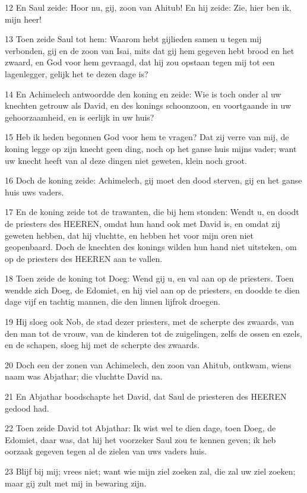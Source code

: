 \par 12 En Saul zeide: Hoor nu, gij, zoon van Ahitub! En hij zeide: Zie, hier ben ik, mijn heer!
\par 13 Toen zeide Saul tot hem: Waarom hebt gijlieden samen u tegen mij verbonden, gij en de zoon van Isai, mits dat gij hem gegeven hebt brood en het zwaard, en God voor hem gevraagd, dat hij zou opstaan tegen mij tot een lagenlegger, gelijk het te dezen dage is?
\par 14 En Achimelech antwoordde den koning en zeide: Wie is toch onder al uw knechten getrouw als David, en des konings schoonzoon, en voortgaande in uw gehoorzaamheid, en is eerlijk in uw huis?
\par 15 Heb ik heden begonnen God voor hem te vragen? Dat zij verre van mij, de koning legge op zijn knecht geen ding, noch op het ganse huis mijns vader; want uw knecht heeft van al deze dingen niet geweten, klein noch groot.
\par 16 Doch de koning zeide: Achimelech, gij moet den dood sterven, gij en het ganse huis uws vaders.
\par 17 En de koning zeide tot de trawanten, die bij hem stonden: Wendt u, en doodt de priesters des HEEREN, omdat hun hand ook met David is, en omdat zij geweten hebben, dat hij vluchtte, en hebben het voor mijn oren niet geopenbaard. Doch de knechten des konings wilden hun hand niet uitsteken, om op de priesters des HEEREN aan te vallen.
\par 18 Toen zeide de koning tot Doeg: Wend gij u, en val aan op de priesters. Toen wendde zich Doeg, de Edomiet, en hij viel aan op de priesters, en doodde te dien dage vijf en tachtig mannen, die den linnen lijfrok droegen.
\par 19 Hij sloeg ook Nob, de stad dezer priesters, met de scherpte des zwaards, van den man tot de vrouw, van de kinderen tot de zuigelingen, zelfs de ossen en ezels, en de schapen, sloeg hij met de scherpte des zwaards.
\par 20 Doch een der zonen van Achimelech, den zoon van Ahitub, ontkwam, wiens naam was Abjathar; die vluchtte David na.
\par 21 En Abjathar boodschapte het David, dat Saul de priesteren des HEEREN gedood had.
\par 22 Toen zeide David tot Abjathar: Ik wist wel te dien dage, toen Doeg, de Edomiet, daar was, dat hij het voorzeker Saul zou te kennen geven; ik heb oorzaak gegeven tegen al de zielen van uws vaders huis.
\par 23 Blijf bij mij; vrees niet; want wie mijn ziel zoeken zal, die zal uw ziel zoeken; maar gij zult met mij in bewaring zijn.

